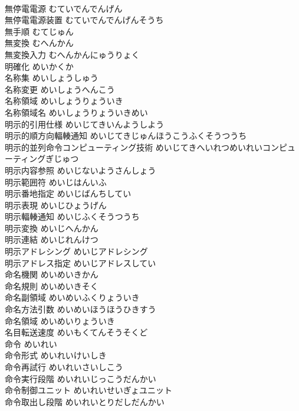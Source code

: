 \documentclass[8pt]{extreport}
\begin{document}
\begin{CJK}{UTF8}{min}
\\	無停電電源	むていでんでんげん	
\\	無停電電源装置	むていでんでんげんそうち	
\\	無手順	むてじゅん	
\\	無変換	むへんかん	
\\	無変換入力	むへんかんにゅうりょく	
\\	明確化	めいかくか	
\\	名称集	めいしょうしゅう	
\\	名称変更	めいしょうへんこう	
\\	名称領域	めいしょうりょういき	
\\	名称領域名	めいしょうりょういきめい	
\\	明示的引用仕様	めいじてきいんようしよう	
\\	明示的順方向輻輳通知	めいじてきじゅんほうこうふくそうつうち	
\\	明示的並列命令コンピューティング技術	めいじてきへいれつめいれいコンピューティングぎじゅつ	
\\	明示内容参照	めいじないようさんしょう	
\\	明示範囲符	めいじはんいふ	
\\	明示番地指定	めいじばんちしてい	
\\	明示表現	めいじひょうげん	
\\	明示輻輳通知	めいじふくそうつうち	
\\	明示変換	めいじへんかん	
\\	明示連結	めいじれんけつ	
\\	明示アドレシング	めいじアドレシング	
\\	明示アドレス指定	めいじアドレスしてい	
\\	命名機関	めいめいきかん	
\\	命名規則	めいめいきそく	
\\	命名副領域	めいめいふくりょういき	
\\	命名方法引数	めいめいほうほうひきすう	
\\	命名領域	めいめいりょういき	
\\	名目転送速度	めいもくてんそうそくど	
\\	命令	めいれい	
\\	命令形式	めいれいけいしき	
\\	命令再試行	めいれいさいしこう	
\\	命令実行段階	めいれいじっこうだんかい	
\\	命令制御ユニット	めいれいせいぎょユニット	
\\	命令取出し段階	めいれいとりだしだんかい	

\end{CJK}
\end{document}
